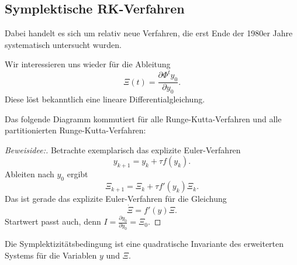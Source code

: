 \subsection{Symplektische RK-Verfahren}

Dabei handelt es sich um relativ neue Verfahren, die erst Ende der 1980er Jahre systematisch untersucht wurden.

Wir interessieren uns wieder für die Ableitung
\begin{equation*}
	\Xi(t) = \frac{\partial \Phi^t y_0}{\partial y_0}.
\end{equation*}
Diese löst bekanntlich eine lineare Differentialgleichung.

\begin{lemma}
	Das folgende Diagramm kommutiert für alle Runge-Kutta-Verfahren und alle partitionierten Runge-Kutta-Verfahren:\\
	\begin{center}
	\end{center}
\end{lemma}
\begin{proof}[Beweisidee:] Betrachte exemplarisch das explizite Euler-Verfahren
	\begin{equation*}
		y_{k+1} = y_k +\tau f(y_k).
	\end{equation*}
	Ableiten nach $y_0$ ergibt
	\begin{equation*}
		\Xi_{k+1} = \Xi_k + \tau f'(y_k)\Xi_k.
	\end{equation*}
	Das ist gerade das explizite Euler-Verfahren für die Gleichung
	\begin{equation*}
		\dot \Xi = f'(y)\Xi.
	\end{equation*}
	Startwert passt auch, denn $I=\frac{\partial y_0}{\partial y_0} = \Xi_0$.
\end{proof}


\begin{idea}
	Die Symplektizitätsbedingung ist eine quadratische Invariante des
	erweiterten Systems für die Variablen $y$ und $\Xi$.
\end{idea}

